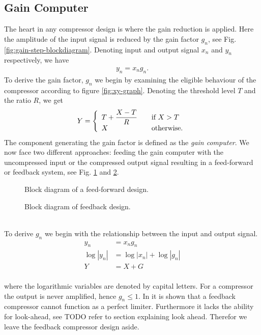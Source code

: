 \subsection{Gain Computer}
The heart in any compressor design is where the gain reduction is applied. Here the amplitude of the input signal is reduced by the gain factor $g_n$, see Fig. \ref{fig:gain-step-blockdiagram}. Denoting input and output signal $x_n$ and $y_n$ respectively, we have
\begin{align}
y_n = x_n g_n.
\label{eq:inout}
\end{align}
To derive the gain factor, $g_n$ we begin by examining the eligible behaviour of the compressor according to figure \ref{fig:xy-graph}. Denoting the threshold level $T$ and the ratio $R$, we get
\begin{equation} \label{eq:gaincomp}
Y = \left\{ 
  \begin{array}{l l}
    T+ \dfrac{X-T}{R} & \quad \text{if $X > T$}\\
    X & \quad \text{otherwise.}
  \end{array} \right.
\end{equation}
The component generating the gain factor is defined as the \emph{gain computer}. We now face two different approaches: feeding the gain computer with the uncompressed input or the compressed output signal resulting in a feed-forward or feedback system, see Fig. \ref{fig:feedforward-blockdiagram} and \ref{fig:feedback-blockdiagram}. 
\begin{figure}[ht]
 \centering

\caption{Block diagram of a feed-forward design.}
\label{fig:feedforward-blockdiagram}
\end{figure}
\begin{figure}[ht]
\centering

\caption{Block diagram of feedback design.} 
\label{fig:feedback-blockdiagram}
\end{figure}
\\ To derive $g_n$ we begin with the relationship between the input and output signal.
\begin{align}
y_n &= x_ng_n   \\
\log|y_n| & = \log|x_n| + \log|g_n|   \\
Y &= X + G \label{eq:cv}
\end{align}
\\ where the logarithmic variables are denoted by capital letters. For a compressor the output is never amplified, hence $g_n \leq 1$. In \cite{giannoullis} it is shown that a feedback compressor cannot function as a perfect limiter. Furthermore it lacks the ability for look-ahead, see TODO refer to section explaining look ahead. Therefor we leave the feedback compressor design aside. 

